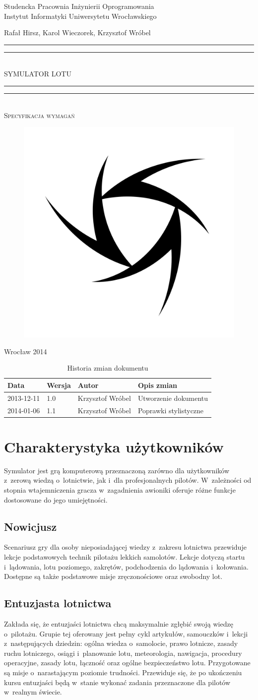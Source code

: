 \documentclass{mwrep}
\newcommand*{\titleGP}{\begingroup
\centering

{\large Studencka Pracownia Inżynierii Oprogramowania}\\Instytut Informatyki Uniwersytetu Wrocławskiego\par
\vspace*{16\baselineskip}

{\Large Rafał Hirsz, Karol Wieczorek, Krzysztof Wróbel\par}
\vspace*{\baselineskip}

\rule{\textwidth}{1.6pt}\vspace*{-\baselineskip}\vspace*{2pt}
\rule{\textwidth}{0.4pt}\\[\baselineskip]

{\Huge SYMULATOR LOTU}\\[0.2\baselineskip]

\rule{\textwidth}{0.4pt}\vspace*{-\baselineskip}\vspace{3.2pt}
\rule{\textwidth}{1.6pt}\\[\baselineskip]

\scshape
{\huge Specyfikacja wymagań}\par
\vspace*{2\baselineskip}

\begin{figure}[h]
\centering
\includegraphics[width=5\baselineskip]{flightsim-team-logo.pdf}
\end{figure}
\vfill

{\large Wrocław 2014}\par

\pagebreak

\endgroup}
\begin{document}
\thispagestyle{empty}
\titleGP

\begin{center}
\begin{table}[h]
\begin{center}
\caption{Historia zmian dokumentu}\label{T:Zmiany}
\vspace{3ex}
\begin{tabularx}{1\textwidth}{|l|l|l|X|}
\hline
Data & Wersja & Autor & Opis zmian \\ \hline
2013-12-11 & 1.0 & Krzysztof Wróbel & Utworzenie dokumentu \\
2014-01-06 & 1.1 & Krzysztof Wróbel & Poprawki stylistyczne \\
\hline
\end{tabularx}
\end{center}
\end{table}
\end{center}

\pagebreak

\tableofcontents

\chapter{Charakterystyka użytkowników}

Symulator jest grą komputerową przeznaczoną zarówno dla użytkowników z~zerową wiedzą o~lotnictwie, jak i~dla profesjonalnych pilotów. W~zależności od stopnia wtajemniczenia gracza w~zagadnienia awioniki oferuje różne funkcje dostosowane do jego umiejętności.

\section{Nowicjusz}

Scenariusz gry dla osoby nieposiadającej wiedzy z~zakresu lotnictwa przewiduje lekcje podstawowych technik pilotażu lekkich samolotów. Lekcje dotyczą startu i~lądowania, lotu poziomego, zakrętów, podchodzenia do lądowania i~kołowania. Dostępne są także podstawowe misje zręczonościowe oraz swobodny lot.

\section{Entuzjasta lotnictwa}

Zakłada się, że entuzjaści lotnictwa chcą maksymalnie zgłębić swoją wiedzę o~pilotażu. Grupie tej oferowany jest pełny cykl artykułów, samouczków i~lekcji z~następujących dziedzin: ogólna wiedza o~samolocie, prawo lotnicze, zasady ruchu lotniczego, osiągi i~planowanie lotu, meteorologia, nawigacja, procedury operacyjne, zasady lotu, łączność oraz ogólne bezpieczeństwo lotu. Przygotowane są misje o~narastającym poziomie trudności. Przewiduje się, że po ukończeniu kursu entuzjaści będą w~stanie wykonać zadania przeznaczone dla pilotów w~realnym świecie.
\end{document}
